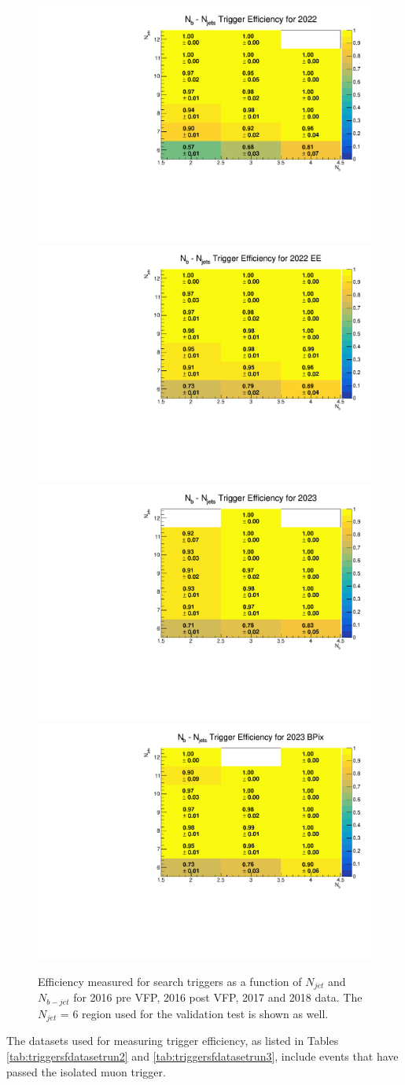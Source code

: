 \documentclass[twoside]{article}
\begin{document}
\begin{figure}[!t]
    \centering
     \includegraphics[width=.4\columnwidth]{plots/Trigger/2022.pdf}
    \includegraphics[width=.4\columnwidth]{plots/Trigger/2022EE.pdf}
    \includegraphics[width=.4\columnwidth]{plots/Trigger/2023.pdf}
    \includegraphics[width=.4\columnwidth]{plots/Trigger/2023BPix.pdf}
    
    \caption{Efficiency measured for search triggers as a function of $N_{jet}$ and $N_{b-jet}$ for 2016 pre VFP, 2016 post VFP, 2017 and 2018 data. The $N_{jet}$ = 6 region used for the validation test is shown as well.}
\end{figure}
The datasets used for measuring trigger efficiency, as listed in Tables \ref{tab:triggersfdatasetrun2} and \ref{tab:triggersfdatasetrun3}, include events that have passed the isolated muon trigger.
\end{document}
